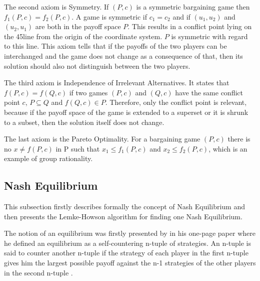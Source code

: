 The second axiom is Symmetry. If $(P,c)$ is a symmetric bargaining game then $f_1(P,c) = f_2(P,c)$. A game is symmetric if $c_1 = c_2$ and if $(u_1, u_2)$ and $(u_2, u_1)$ are both in the payoff space $P$. This results in a conflict point lying on the 45\textdegree  line from the origin of the coordinate system. $P$ is symmetric with regard to this line. This axiom tells that if the payoffs of the two players can be interchanged and the game does not change as a consequence of that, then its solution should also not distinguish between the two players.

The third axiom is Independence of Irrelevant Alternatives. It states that $f(P,c) = f(Q,c)$ if two games $(P,c)$ and $(Q,c)$ have the same conflict point $c$, $P \subseteq Q$ and $f(Q,c) \in P$. Therefore, only the conflict point is relevant, because if the payoff space of the game is extended to a superset or it is shrunk to a subset, then the solution itself does not change.

The last axiom is the Pareto Optimality. For a bargaining game $(P,c)$ there is no $x \neq f(P,c)$ in P such that $x_1 \leq f_1(P,c)$ and $x_2 \leq f_2(P,c)$, which is an example of group rationality.

\subsection{Nash Equilibrium}
This subsection firstly describes formally the concept of Nash Equilibrium and then presents the Lemke-Howson algorithm for finding one Nash Equilibrium.

The notion of an equilibrium was firstly presented by \citet{nash1950equilibrium} in his one-page paper where he defined an equilibrium as a self-countering n-tuple of strategies. An n-tuple is said to counter another n-tuple if the strategy of each player in the first n-tuple gives him the largest possible payoff against the n-1 strategies of the other players in the second n-tuple \citep{nash1950equilibrium}. 

